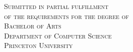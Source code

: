 \begin{titlepage}
    \vspace*{1.25in}
    \makeatletter
    \begin{center}
        \Huge\textsf{\@title}
        \Large\@subtitle
        \vfill
        \Large\@author
        \vfill
        \normalsize\textsc{
            Submitted in partial fulfillment\\
            of the requirements for the degree of\\
            Bachelor of Arts\\
            Department of Computer Science\\
            Princeton University
        }
        \vfill
        \Large\@date
    \end{center}
    \makeatother
    \vspace*{1.25in}
    \end{titlepage}
\cleardoubleemptypage
